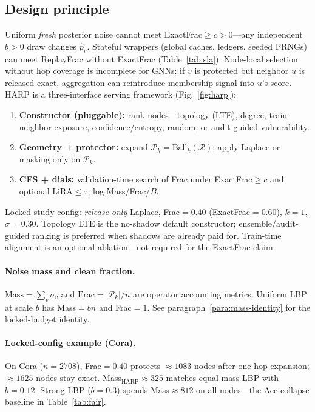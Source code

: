 \documentclass[conference]{IEEEtran}
\begin{document}
\subsection{Design principle}
Uniform \emph{fresh} posterior noise cannot meet ExactFrac$\ge c{>}0$---any independent $b{>}0$ draw changes $\hat p_v$.
Stateful wrappers (global caches, ledgers, seeded PRNGs) can meet ReplayFrac without ExactFrac (Table~\ref{tab:sla}).
Node-local selection without hop coverage is incomplete for GNNs: if $v$ is protected but neighbor $u$ is released exact, aggregation can reintroduce membership signal into $u$'s score.
HARP is a three-interface serving framework (Fig.~\ref{fig:harp}):
\begin{enumerate}
  \item \textbf{Constructor (pluggable):} rank nodes---topology (LTE), degree, train-neighbor exposure, confidence/entropy, random, or audit-guided vulnerability.
  \item \textbf{Geometry + protector:} expand $\mathcal{P}_k=\mathrm{Ball}_k(\mathcal{R})$; apply Laplace or masking only on $\mathcal{P}_k$.
  \item \textbf{CFS + dials:} validation-time search of Frac under ExactFrac$\ge c$ and optional LiRA$\le\tau$; log Mass/Frac/\(B\).
\end{enumerate}
Locked study config: \emph{release-only} Laplace, Frac${=}0.40$ (ExactFrac${=}0.60$), $k{=}1$, $\sigma{=}0.30$.
Topology LTE is the no-shadow default constructor; ensemble/audit-guided ranking is preferred when shadows are already paid for.
Train-time alignment is an optional ablation---not required for the ExactFrac claim.

\paragraph{Noise mass and clean fraction.}
$\mathrm{Mass}=\sum_v\sigma_v$ and $\mathrm{Frac}=|\mathcal{P}_k|/n$ are operator accounting metrics.
Uniform LBP at scale $b$ has Mass${=}bn$ and Frac${=}1$.
See paragraph~\ref{para:mass-identity} for the locked-budget identity.

\paragraph{Locked-config example (Cora).}
On Cora ($n{=}2708$), Frac${=}0.40$ protects ${\approx}1083$ nodes after one-hop expansion; ${\approx}1625$ nodes stay exact.
Mass$_{\mathrm{HARP}}{\approx}325$ matches equal-mass LBP with $b{=}0.12$.
Strong LBP ($b{=}0.3$) spends Mass${\approx}812$ on all nodes---the Acc-collapse baseline in Table~\ref{tab:fair}.
\end{document}
